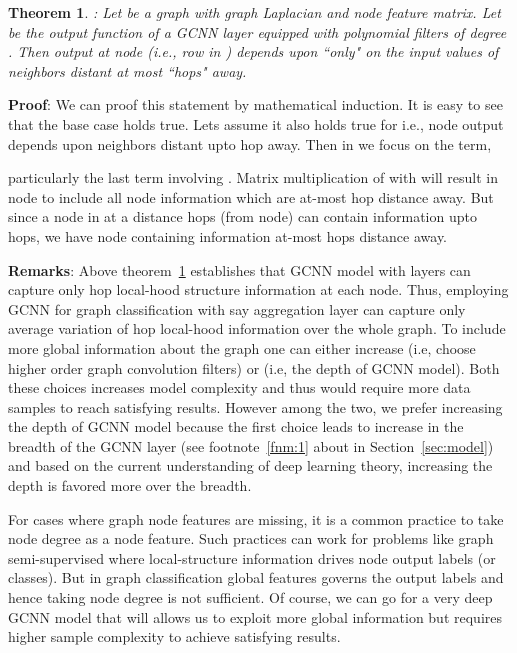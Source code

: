\documentclass{article}
\newtheorem{theorem}{Theorem}
\begin{document}
\begin{theorem}\label{thm:k_hop_info}:
	\textit{Let   be a graph with  graph Laplacian and  node feature matrix. Let  be the output function of a   GCNN layer equipped with polynomial filters of degree . Then  output at  node (i.e.,  row in ) depends upon ``only" on the   input values of  neighbors distant at most ``hops" away.}\end{theorem}

\noindent\textbf{Proof}:  We can   proof this statement by mathematical induction. It is easy to see that the base case   holds true. Lets assume it also holds true for  i.e.,  node output   depends upon neighbors distant upto  hop away. Then in    we focus on the term,



 particularly the last term involving . Matrix multiplication of  with    will result in  node to include all node information which are at-most hop distance away. But since a node in  at a distance hops (from  node) can contain information upto  hops, we have  node containing information at-most  hops distance away. 


\noindent \textbf{Remarks}: Above theorem~\ref{thm:k_hop_info} establishes that  GCNN model with  layers can capture only hop local-hood structure information at each node. Thus, employing GCNN for graph classification with say aggregation layer can capture only   average variation of hop local-hood information over the whole graph. To include more  global information   about the graph one can either increase  (i.e, choose higher order graph convolution filters) or  (i.e, the depth of GCNN model). Both these choices increases model complexity and thus would require more data samples to reach satisfying results. However among the two, we prefer increasing the depth of GCNN model because the first choice leads to increase in the breadth of the GCNN layer (see footnote~\ref{fnm:1} about  in Section~\ref{sec:model}) and based on the current understanding of deep learning theory, increasing the depth is   favored more over  the breadth.   


 
For cases  where graph node features are missing, it is a common practice to take node degree as a node feature. Such practices can work for problems like graph semi-supervised where local-structure information drives node output labels (or classes). But in graph classification global features governs the output labels and hence taking node degree is not sufficient. Of course, we can go for a very deep GCNN model that will allows us to exploit more global information but requires higher sample  complexity to achieve satisfying results. 
\end{document}
